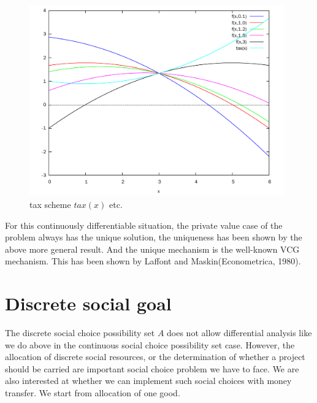 
 \begin{figure}
\centering
\includegraphics[width = 11cm]{tax.pdf}
\caption{tax scheme $tax(x)$ etc.} \label{fig:tax}
\end{figure}

For this continuously differentiable situation, the private value case of the problem always has the unique solution, the uniqueness
has been shown by the above more general result. And the unique mechanism is the well-known VCG mechanism. This has been shown by
Laffont and Maskin(Econometrica, 1980). 

\section{Discrete social goal}
The discrete social choice possibility set $A$ does not allow differential analysis like we do above in the continuous social choice
possibility set case. However, the allocation of discrete social resources, or the determination of whether a project should be carried
are important social choice problem we have to face. We are also interested at whether we can implement such social choices with money
transfer. We start from allocation of one good.

